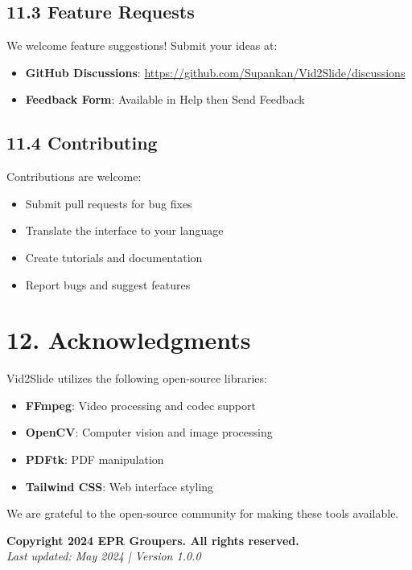 \documentclass[12pt,a4paper]{article}
\newcommand{\sectionTitle}[1]{\section*{#1}}
\newcommand{\subsectionTitle}[1]{\subsection*{#1}}
\begin{document}
\subsectionTitle{11.3 Feature Requests}

We welcome feature suggestions! Submit your ideas at:
\begin{itemize}
    \item \textbf{GitHub Discussions}: \url{https://github.com/Supankan/Vid2Slide/discussions}
    \item \textbf{Feedback Form}: Available in Help then Send Feedback
\end{itemize}

\subsectionTitle{11.4 Contributing}

Contributions are welcome:
\begin{itemize}
    \item Submit pull requests for bug fixes
    \item Translate the interface to your language
    \item Create tutorials and documentation
    \item Report bugs and suggest features
\end{itemize}

\newpage

\sectionTitle{12. Acknowledgments}

Vid2Slide utilizes the following open-source libraries:
\begin{itemize}
    \item \textbf{FFmpeg}: Video processing and codec support
    \item \textbf{OpenCV}: Computer vision and image processing
    \item \textbf{PDFtk}: PDF manipulation
    \item \textbf{Tailwind CSS}: Web interface styling
\end{itemize}

We are grateful to the open-source community for making these tools available.

\vfill

\begin{center}
\textbf{\large Copyright 2024 EPR Groupers. All rights reserved.}\\[0.5em]
\textit{Last updated: May 2024 | Version 1.0.0}
\end{center}
\end{document}
